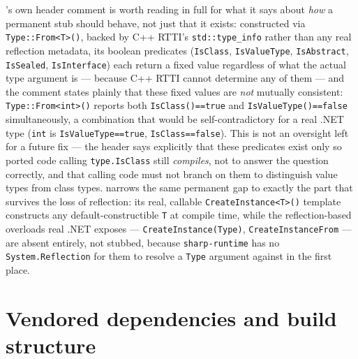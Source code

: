 's own header comment is worth reading in full for what it says about
\emph{how} a permanent stub should behave, not just that it exists: constructed via
\texttt{Type::From<T>()}, backed by C++ RTTI's \texttt{std::type\_info} rather than any real
reflection metadata, its boolean predicates (\texttt{IsClass}, \texttt{IsValueType},
\texttt{IsAbstract}, \texttt{IsSealed}, \texttt{IsInterface}) each return a fixed value
regardless of what the actual type argument is --- because C++ RTTI cannot determine any of
them --- and the comment states plainly that these fixed values are \emph{not} mutually
consistent: \texttt{Type::From<int>()} reports both \texttt{IsClass()==true} and
\texttt{IsValueType()==false} simultaneously, a combination that would be self-contradictory for
a real .NET type (\texttt{int} is \texttt{IsValueType==true}, \texttt{IsClass==false}). This is
not an oversight left for a future fix --- the header says explicitly that these predicates
exist only so ported code calling \texttt{type.IsClass} still \emph{compiles}, not to answer the
question correctly, and that calling code must not branch on them to distinguish value types
from class types.  narrows the same permanent gap to exactly the
part that survives the loss of reflection: its real, callable
\texttt{CreateInstance<T>()} template constructs any default-constructible \texttt{T} at
compile time, while the reflection-based overloads real .NET exposes ---
\texttt{CreateInstance(Type)}, \texttt{CreateInstanceFrom} --- are absent entirely, not stubbed,
because \texttt{sharp-runtime} has no \texttt{System.Reflection} for them to resolve a
\texttt{Type} argument against in the first place.

\section{Vendored dependencies and build structure}

